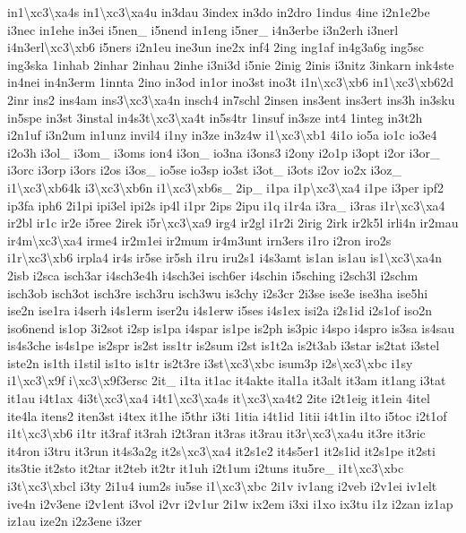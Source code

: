 \begin{DoxyCompactItemize}
in1\textbackslash{}xc3\textbackslash{}xa4s in1\textbackslash{}xc3\textbackslash{}xa4u in3dau 3index in3do in2dro 1indus 4ine i2n1e2be i3nec in1ehe in3ei i5nen\-\_\- i5nend in1eng i5ner\-\_\- i4n3erbe i3n2erh i3nerl i4n3erl\textbackslash{}xc3\textbackslash{}xb6 i5ners i2n1eu ine3un ine2x inf4 2ing ing1af in4g3a6g ing5sc ing3ska 1inhab 2inhar 2inhau 2inhe i3ni3d i5nie 2inig 2inis i3nitz 3inkarn ink4ste in4nei in4n3erm 1innta 2ino in3od in1or ino3st ino3t i1n\textbackslash{}xc3\textbackslash{}xb6 in1\textbackslash{}xc3\textbackslash{}xb62d 2inr ins2 ins4am ins3\textbackslash{}xc3\textbackslash{}xa4n insch4 in7schl 2insen ins3ent ins3ert ins3h in3sku in5spe in3st 3instal in4s3t\textbackslash{}xc3\textbackslash{}xa4t in5s4tr 1insuf in3sze int4 1integ in3t2h i2n1uf i3n2um in1unz invil4 i1ny in3ze in3z4w i1\textbackslash{}xc3\textbackslash{}xb1 4i1o io5a io1c io3e4 i2o3h i3ol\-\_\- i3om\-\_\- i3oms ion4 i3on\-\_\- io3na i3ons3 i2ony i2o1p i3opt i2or i3or\-\_\- i3orc i3orp i3ors i2os i3os\-\_\- io5se io3sp io3st i3ot\-\_\- i3ots i2ov io2x i3oz\-\_\- i1\textbackslash{}xc3\textbackslash{}xb64k i3\textbackslash{}xc3\textbackslash{}xb6n i1\textbackslash{}xc3\textbackslash{}xb6s\-\_\- 2ip\-\_\- i1pa i1p\textbackslash{}xc3\textbackslash{}xa4 i1pe i3per ipf2 ip3fa iph6 2i1pi ipi3el ipi2s ip4l i1pr 2ips 2ipu i1q i1r4a i3ra\-\_\- i3ras i1r\textbackslash{}xc3\textbackslash{}xa4 ir2bl ir1c ir2e i5ree 2irek i5r\textbackslash{}xc3\textbackslash{}xa9 irg4 ir2gl i1r2i 2irig 2irk ir2k5l irli4n ir2mau ir4m\textbackslash{}xc3\textbackslash{}xa4 irme4 ir2m1ei ir2mum ir4m3unt irn3ers i1ro i2ron iro2s i1r\textbackslash{}xc3\textbackslash{}xb6 irpla4 ir4s ir5se ir5sh i1ru iru2s1 i4s3amt is1an is1au is1\textbackslash{}xc3\textbackslash{}xa4n 2isb i2sca isch3ar i4sch3e4h i4sch3ei isch6er i4schin i5sching i2sch3l i2schm isch3ob isch3ot isch3re isch3ru isch3wu is3chy i2s3cr 2i3se ise3e ise3ha ise5hi ise2n ise1ra i4serh i4s1erm iser2u i4s1erw i5ses i4s1ex isi2a i2s1id i2s1of iso2n iso6nend is1op 3i2sot i2sp is1pa i4spar is1pe is2ph is3pic i4spo i4spro is3sa is4sau is4s3che is4s1pe is2spr is2st iss1tr is2sum i2st is1t2a is2t3ab i3star is2tat i3stel iste2n is1th i1stil is1to is1tr is2t3re i3st\textbackslash{}xc3\textbackslash{}xbc isum3p i2s\textbackslash{}xc3\textbackslash{}xbc i1sy i1\textbackslash{}xc3\textbackslash{}x9f i\textbackslash{}xc3\textbackslash{}x9f3ersc 2it\-\_\- i1ta it1ac it4akte ital1a it3alt it3am it1ang i3tat it1au i4t1ax 4i3t\textbackslash{}xc3\textbackslash{}xa4 i4t1\textbackslash{}xc3\textbackslash{}xa4s it\textbackslash{}xc3\textbackslash{}xa4t2 2ite i2t1eig it1ein 4itel ite4la itens2 iten3st i4tex it1he i5thr i3ti 1itia i4t1id 1itii i4t1in i1to i5toc i2t1of i1t\textbackslash{}xc3\textbackslash{}xb6 i1tr it3raf it3rah i2t3ran it3ras it3rau it3r\textbackslash{}xc3\textbackslash{}xa4u it3re it3ric it4ron i3tru it3run it4s3a2g it2s\textbackslash{}xc3\textbackslash{}xa4 it2s1e2 it4s5er1 it2s1id it2s1pe it2sti its3tie it2sto it2tar it2teb it2tr it1uh i2t1um i2tuns itu5re\-\_\- i1t\textbackslash{}xc3\textbackslash{}xbc i3t\textbackslash{}xc3\textbackslash{}xbcl i3ty 2i1u4 ium2s iu5se i1\textbackslash{}xc3\textbackslash{}xbc 2i1v iv1ang i2veb i2v1ei iv1elt ive4n i2v3ene i2v1ent i3vol i2vr i2v1ur 2i1w ix2em i3xi i1xo ix3tu i1z i2zan iz1ap iz1au ize2n i2z3ene i3zer 
\end{DoxyCompactItemize}
